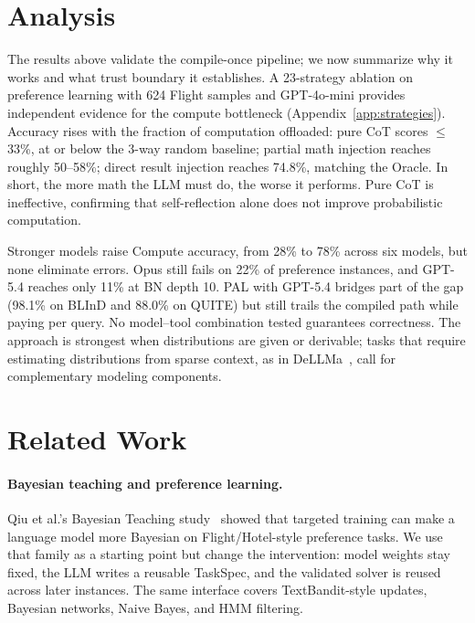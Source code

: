 \documentclass{article}
\newcommand{\taskspec}{TaskSpec}
\begin{document}
\section{Analysis}
\label{sec:analysis}

The results above validate the compile-once pipeline; we now summarize why it works and what trust boundary it establishes.
A 23-strategy ablation on preference learning with 624 Flight samples and GPT-4o-mini provides independent evidence for the compute bottleneck (Appendix~\ref{app:strategies}).
Accuracy rises with the fraction of computation offloaded: pure CoT scores $\leq$33\%, at or below the 3-way random baseline; partial math injection reaches roughly 50--58\%; direct result injection reaches 74.8\%, matching the Oracle.
In short, the more math the LLM must do, the worse it performs.
Pure CoT is ineffective, confirming that self-reflection alone does not improve probabilistic computation.

Stronger models raise Compute accuracy, from 28\% to 78\% across six models, but none eliminate errors. Opus still fails on 22\% of preference instances, and GPT-5.4 reaches only 11\% at BN depth 10.
PAL with GPT-5.4 bridges part of the gap (98.1\% on BLInD and 88.0\% on QUITE) but still trails the compiled path while paying per query.
No model--tool combination tested guarantees correctness.
The approach is strongest when distributions are given or derivable; tasks that require estimating distributions from sparse context, as in DeLLMa~\citep{liu2025dellma}, call for complementary modeling components.

\section{Related Work}
\label{sec:related}

\paragraph{Bayesian teaching and preference learning.}
Qiu et al.'s Bayesian Teaching study~\citep{qiu2026bayesian} showed that targeted training can make a language model more Bayesian on Flight/Hotel-style preference tasks.
We use that family as a starting point but change the intervention: model weights stay fixed, the LLM writes a reusable \taskspec{}, and the validated solver is reused across later instances.
The same interface covers TextBandit-style updates, Bayesian networks, Naive Bayes, and HMM filtering.
\end{document}
